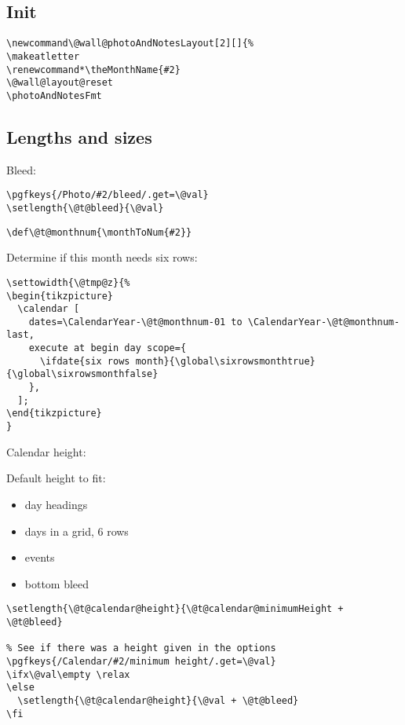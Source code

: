 \documentclass[11pt,oneside]{memoir-article}
\begin{document}
\subsection{Init}
\label{sec:org704cc8b}

\begin{verbatim}
\newcommand\@wall@photoAndNotesLayout[2][]{%
\makeatletter
\renewcommand*\theMonthName{#2}
\@wall@layout@reset
\photoAndNotesFmt
\end{verbatim}

\subsection{Lengths and sizes}
\label{sec:org0c06ba2}

Bleed:

\begin{verbatim}
\pgfkeys{/Photo/#2/bleed/.get=\@val}
\setlength{\@t@bleed}{\@val}
\end{verbatim}

\begin{verbatim}
\def\@t@monthnum{\monthToNum{#2}}
\end{verbatim}

Determine if this month needs six rows:

\begin{verbatim}
\settowidth{\@tmp@z}{%
\begin{tikzpicture}
  \calendar [
    dates=\CalendarYear-\@t@monthnum-01 to \CalendarYear-\@t@monthnum-last,
    execute at begin day scope={
      \ifdate{six rows month}{\global\sixrowsmonthtrue}{\global\sixrowsmonthfalse}
    },
  ];
\end{tikzpicture}
}
\end{verbatim}

Calendar height:

Default height to fit:

\begin{itemize}
\item day headings
\item days in a grid, 6 rows
\item events
\item bottom bleed
\end{itemize}

\begin{verbatim}
\setlength{\@t@calendar@height}{\@t@calendar@minimumHeight + \@t@bleed}

% See if there was a height given in the options
\pgfkeys{/Calendar/#2/minimum height/.get=\@val}
\ifx\@val\empty \relax
\else
  \setlength{\@t@calendar@height}{\@val + \@t@bleed}
\fi
\end{verbatim}
\end{document}
